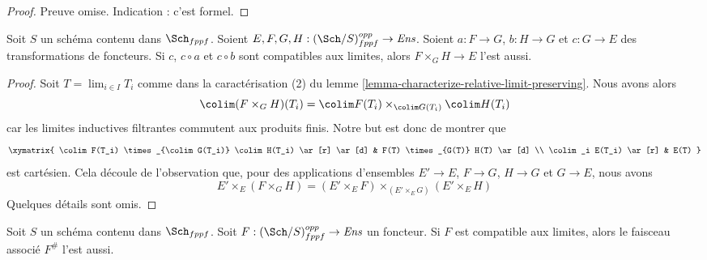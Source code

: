 \begin{proof}
Preuve omise. Indication : c'est formel.
\end{proof}

\begin{lemma}
\label{lemma-fibre-product-locally-finite-presentation}
Soit $S$ un schéma contenu dans $\Sch_{fppf}$.
Soient $E, F, G, H : (\Sch/S)_{fppf}^{opp} \to \textit{Ens}$.
Soient $a : F \to G$, $b : H \to G$ et $c : G \to E$
des transformations de foncteurs. Si $c$, $c \circ a$ et $c \circ b$
sont compatibles aux limites, alors $F \times_G H \to E$ l'est aussi.
\end{lemma}

\begin{proof}
Soit $T = \lim_{i \in I} T_i$ comme dans la caractérisation (2) du
lemme \ref{lemma-characterize-relative-limit-preserving}.
Nous avons alors
$$
\colim (F \times_G H)(T_i) =
\colim F(T_i) \times_{\colim G(T_i)} \colim H(T_i)
$$
car les limites inductives filtrantes commutent aux produits finis. Notre but est donc de
montrer que
$$
\xymatrix{
\colim F(T_i) \times_{\colim G(T_i)} \colim H(T_i) \ar[r] \ar[d] &
F(T) \times_{G(T)} H(T) \ar[d] \\
\colim_i E(T_i) \ar[r] & E(T)
}
$$
est cartésien. Cela découle de l'observation que,
pour des applications d'ensembles $E' \to E$, $F \to G$, $H \to G$ et $G \to E$,
nous avons
$$
E' \times_E (F \times_G H) =
(E' \times_E F) \times_{(E' \times_E G)} (E' \times_E H)
$$
Quelques détails sont omis.
\end{proof}

\begin{lemma}
\label{lemma-sheafify-finite-presentation}
Soit $S$ un schéma contenu dans $\Sch_{fppf}$.
Soit $F : (\Sch/S)_{fppf}^{opp} \to \textit{Ens}$ un foncteur.
Si $F$ est compatible aux limites, alors le faisceau associé $F^\#$ l'est aussi.
\end{lemma}

